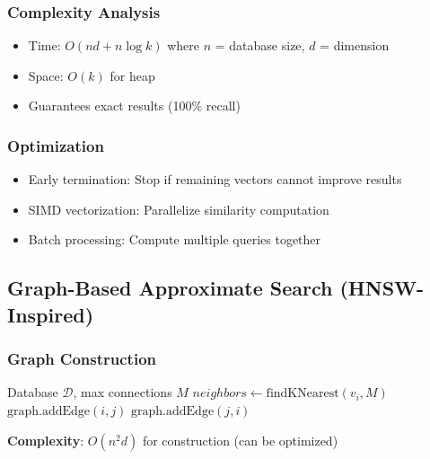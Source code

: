 \documentclass[12pt,a4paper]{article}
\begin{document}
\subsubsection{Complexity Analysis}
\begin{itemize}
    \item Time: $O(nd + n \log k)$ where $n$ = database size, $d$ = dimension
    \item Space: $O(k)$ for heap
    \item Guarantees exact results (100\% recall)
\end{itemize}

\subsubsection{Optimization}
\begin{itemize}
    \item Early termination: Stop if remaining vectors cannot improve results
    \item SIMD vectorization: Parallelize similarity computation
    \item Batch processing: Compute multiple queries together
\end{itemize}

\subsection{Graph-Based Approximate Search (HNSW-Inspired)}

\subsubsection{Graph Construction}
\begin{algorithm}
\caption{Build Navigation Graph}
\begin{algorithmic}[1]
\Require Database $\mathcal{D}$, max connections $M$
    \State $neighbors \gets \text{findKNearest}(v_i, M)$
        \State $\text{graph.addEdge}(i, j)$
        \State $\text{graph.addEdge}(j, i)$ 
    \EndFor
\EndFor
\end{algorithmic}
\end{algorithm}

\textbf{Complexity}: $O(n^2 d)$ for construction (can be optimized)
\end{document}

